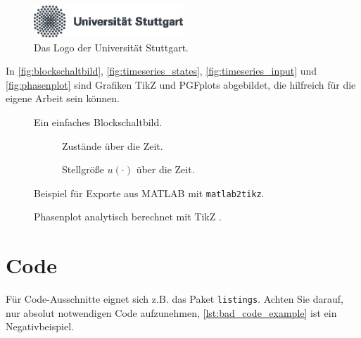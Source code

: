 \begin{figure}[htb]
\centering
\includegraphics[width=0.5\textwidth]{images/logo-university-de.eps}
\caption{Das Logo der Universität Stuttgart.}
\label{fig:ustutt_logo}
\end{figure}

In \autoref{fig:blockschaltbild}, \autoref{fig:timeseries_states}, \autoref{fig:timeseries_input} und \autoref{fig:phasenplot} sind Grafiken TikZ und PGFplots abgebildet, die hilfreich für die eigene Arbeit sein können.


\begin{figure}[htbp]
    \centering
    
    \caption{Ein einfaches Blockschaltbild.}
    \label{fig:blockschaltbild}
\end{figure}

\begin{figure}[htbp]

\centering
\begin{subfigure}[b]{0.95\textwidth}
    
    \caption{Zustände über die Zeit.}
    \label{fig:timeseries_states}
\end{subfigure}

\begin{subfigure}[b]{0.95\textwidth}
    
    \caption{Stellgröße \(u(\cdot)\) über die Zeit.}
    \label{fig:timeseries_input}
\end{subfigure}

\caption{Beispiel für Exporte  aus MATLAB mit \texttt{matlab2tikz}.}
\label{fig:timeseries}
\end{figure}


\begin{figure}[htbp]
    \centering
    
    \caption{Phasenplot analytisch berechnet mit TikZ \cite{Tantau2013}.}
    \label{fig:phasenplot}
\end{figure}

\FloatBarrier

\section{Code}

Für Code-Ausschnitte eignet sich z.B. das Paket \texttt{listings}. 
Achten Sie darauf, nur absolut notwendigen Code aufzunehmen, \autoref{lst:bad_code_example} ist ein Negativbeispiel.

